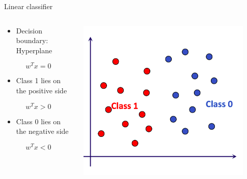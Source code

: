 \documentclass[aspectratio=169, 14pt]{beamer}
\begin{document}
\begin{frame}[t]{Linear classifier}
\begin{columns}
	\begin{column}{0.55\textwidth}
	\begin{itemize}
	  \item Decision boundary: Hyperplane
	\end{itemize}
	\[ w^{T} x=0 \]

	\begin{itemize}
	  \item Class 1 lies on the positive side
	\end{itemize}
	\[ w^{T} x>0 \]


	\begin{itemize}
	  \item Class 0 lies on the negative side
	\end{itemize}
        \[ w^{T} x<0 \]

	\end{column}
	\begin{column}{0.45\textwidth}
		\vskip-0.5cm
                \includegraphics[width=0.9\textwidth]{SVM_NonLinear_Images/AIML_SVM_IMG2.png}
	\end{column}
\end{columns}

\end{frame}
\end{document}
